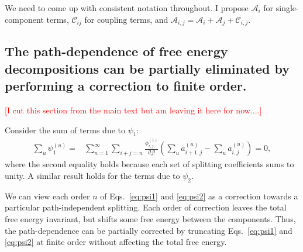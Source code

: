 \documentclass{article}
\newcommand{\warning}[1]{{\textsf{{\textcolor{red}{{[#1]}{}}}}}}
\begin{document}
We need to come up with consistent notation throughout. I propose $\mathcal{A}_i$ for single-component terms, $\mathcal{C}_{ij}$ for coupling terms, and $\mathcal{A}_{i,j} = \mathcal{A}_i + \mathcal{A}_j + \mathcal{C}_{i,j}$.



\subsection*{The path-dependence of free energy decompositions can be partially eliminated by performing a correction to finite order.}
\warning{I cut this section from the main text but am leaving it here for now....}

Consider the sum of terms due to $\psi_1$:
\begin{align*}
\sum_u \psi_1^{(u)} =&
	\sum_{n=1}^{\infty}
    \sum_{i+j=n}
        \frac{\phi_{i,j}^{(1)}}{i!j!}
        \left(
        		\sum_u a_{i+1,j}^{(u)} -
        		\sum_u a_{i,j}^{(u)}
        \right) = 0,
\end{align*}
where the second equality holds because each set of splitting coefficients sums to unity. A similar result holds for the terms due to $\psi_2$.

We can view each order $n$ of Eqs.~\ref{eq:psi1} and \ref{eq:psi2} as a correction towards a particular path-independent splitting. Each order of correction leaves the total free energy invariant, but shifts some free energy between the components. Thus, the path-dependence can be partially corrected by truncating Eqs.~\ref{eq:psi1} and \ref{eq:psi2} at finite order without affecting the total free energy.


\end{document}
